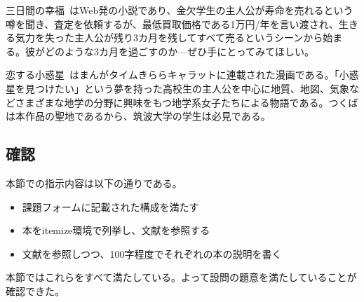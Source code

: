 \documentclass[dvipdfmx,12pt,a4j]{jarticle}
\begin{document}
三日間の幸福~\cite{koufuku}はWeb発の小説であり、金欠学生の主人公が寿命を売れるという噂を聞き、査定を依頼するが、最低買取価格である1万円/年を言い渡され、生きる気力を失った主人公が残り3カ月を残してすべて売るというシーンから始まる。彼がどのような3カ月を過ごすのか—ぜひ手にとってみてほしい。

恋する小惑星~\cite{koiasu}はまんがタイムきららキャラットに連載された漫画である。「小惑星を見つけたい」という夢を持った高校生の主人公を中心に地質、地図、気象などさまざまな地学の分野に興味をもつ地学系女子たちによる物語である。つくばは本作品の聖地であるから、筑波大学の学生は必見である。
\subsection{確認}
本節での指示内容は以下の通りである。
\begin{itemize}
  \item 課題フォームに記載された構成を満たす
  \item 本をitemize環境で列挙し、文献を参照する
  \item 文献を参照しつつ、100字程度でそれぞれの本の説明を書く
\end{itemize}
本節ではこれらをすべて満たしている。よって設問の題意を満たしていることが確認できた。



\end{document}
